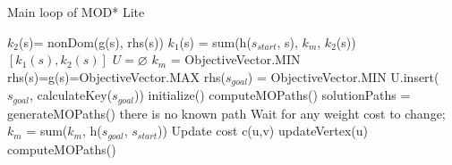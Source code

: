 \begin{algorithm}
	\caption{Main loop of MOD* Lite}
	\label{algMain}
	{\fontsize{9}{9}\selectfont
    \begin{algorithmic}[1] %
      	\State $k_{2}$(s)= nonDom(g(s), rhs(s))
      	\State $k_{1}$(s) = sum(h($s_{start}$, s), $k_{m}$, $k_{2}$(s))
      	\State \Return $[k_{1}(s), k_{2}(s)]$
      \EndFunction
   	  \Statex
      	\State $U = \varnothing $
      	\State $k_{m}$ = ObjectiveVector.MIN
     		\State rhs(s)=g(s)=ObjectiveVector.MAX
     	\EndFor
      	\State rhs($s_{goal}$) = ObjectiveVector.MIN
      	\State U.insert($s_{goal}$, calculateKey($s_{goal}$))
	  \EndFunction
	  \Statex
      	\State initialize()
      	\State computeMOPaths()
    	      	\State solutionPaths = generateMOPaths()
    	      	 there is no known path \EndIf
    	      	\State Wait for any weight cost to change;
    	      		\State $k_{m}$ = sum($k_{m}$, h($s_{goal}$, $s_{start}$))
    	      			\State Update cost c(u,v)
    	      			\State updateVertex(u)
    	      		\EndFor
		      	\State computeMOPaths()
    	      	\EndIf
		\EndWhile
  	  \EndFunction
    \end{algorithmic}}
\end{algorithm}

